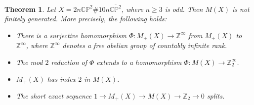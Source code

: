 \documentclass{amsart}
\newtheorem{theorem}{Theorem}[section]
\theoremstyle{definition}
\theoremstyle{remark}
\numberwithin{equation}{section}
\begin{document}
\begin{theorem}\label{thm:nfg}
Let $X = 2n \mathbb{CP}^2 \# 10n \overline{\mathbb{CP}^2}$, where $n \ge 3$ is odd. Then $M(X)$ is not finitely generated. More precisely, the following holds:
\begin{itemize}
\item[(1)]{There is a surjective homomorphism $\Phi : M_+(X) \to \mathbb{Z}^\infty$ from $M_+(X)$ to $\mathbb{Z}^{\infty}$, where $\mathbb{Z}^{\infty}$ denotes a free abelian group of countably infinite rank.}
\item[(2)]{The mod $2$ reduction of $\Phi$ extends to a homomorphism $\Phi : M(X) \to \mathbb{Z}_2^\infty$.}
\item[(3)]{$M_+(X)$ has index $2$ in $M(X)$.}
\item[(4)]{The short exact sequence $1 \to M_+(X) \to M(X) \to \mathbb{Z}_2 \to 0$ splits.}
\end{itemize}
\end{theorem}
\end{document}
